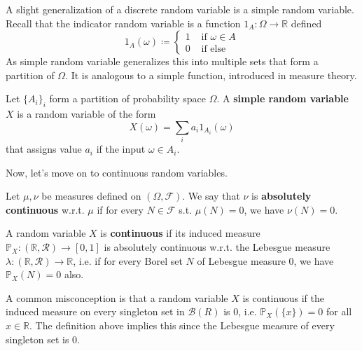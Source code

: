 \documentclass{article}
\begin{document}
      A slight generalization of a discrete random variable is a simple random variable. Recall that the indicator random variable is a function $1_A: \Omega \rightarrow \mathbb{R}$ defined 
      \begin{equation}
        1_A (\omega) \coloneqq \begin{cases} 1 & \text{ if } \omega \in A \\
        0 & \text{ if else } \end{cases}
      \end{equation}
      As simple random variable generalizes this into multiple sets that form a partition of $\Omega$. It is analogous to a simple function, introduced in measure theory. 

      \begin{definition}
        Let $\{A_i\}_i$ form a partition of probability space $\Omega$. A \textbf{simple random variable} $X$ is a random variable of the form 
        \begin{equation}
          X (\omega) = \sum_{i} a_i 1_{A_i} (\omega)
        \end{equation}
        that assigns value $a_i$ if the input $\omega \in A_i$. 
      \end{definition}

      Now, let's move on to continuous random variables. 

      \begin{definition}
        Let $\mu, \nu$ be measures defined on $(\Omega, \mathcal{F})$. We say that $\nu$ is \textbf{absolutely continuous} w.r.t. $\mu$ if for every $N \in \mathcal{F}$ s.t. $\mu(N) = 0$, we have $\nu(N) = 0$. 
      \end{definition}

      \begin{definition}
        A random variable $X$ is \textbf{continuous} if its induced measure $\mathbb{P}_X: (\mathbb{R}, \mathcal{R}) \rightarrow [0, 1]$ is absolutely continuous w.r.t. the Lebesgue measure $\lambda: (\mathbb{R}, \mathcal{R}) \rightarrow \mathbb{R}$, i.e. if for every Borel set $N$ of Lebesgue measure $0$, we have $\mathbb{P}_X (N) = 0$ also. 
      \end{definition}

      A common misconception is that a random variable $X$ is continuous if the induced measure on every singleton set in $\mathcal{B}(R)$ is $0$, i.e. $\mathbb{P}_X (\{x\}) = 0$ for all $x \in \mathbb{R}$. The definition above implies this since the Lebesgue measure of every singleton set is $0$. 
\end{document}
